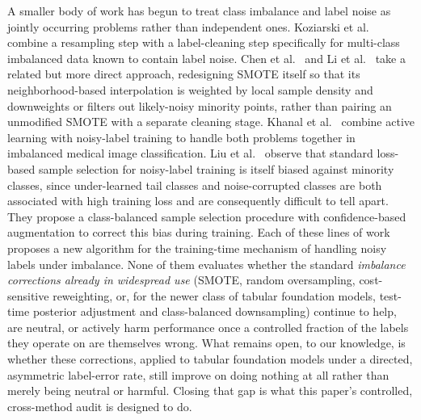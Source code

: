 A smaller body of work has begun to treat class imbalance and label noise as
jointly occurring problems rather than independent ones. Koziarski et
al.~\cite{koziarski2020ccr} combine a resampling step with a label-cleaning step
specifically for multi-class imbalanced data known to contain label noise.
Chen et al.~\cite{chen2021rsmote} and Li et al.~\cite{li2024wrnd} take a
related but more direct approach, redesigning SMOTE itself so that its
neighborhood-based interpolation is weighted by local sample density and
downweights or filters out likely-noisy minority points, rather than pairing
an unmodified SMOTE with a separate cleaning stage. Khanal et
al.~\cite{khanal2024activelabel} combine active learning with
noisy-label training to handle both problems together in imbalanced medical
image classification. Liu et al.~\cite{liu2024imbalancednoisy} observe that
standard loss-based sample selection for noisy-label training is itself biased
against minority classes, since under-learned tail classes and noise-corrupted
classes are both associated with high training loss and are consequently
difficult to tell apart. They propose a class-balanced sample selection
procedure with confidence-based augmentation to correct this bias during
training. Each of these lines of work proposes a new algorithm for the
training-time mechanism of handling noisy labels under imbalance. None of them
evaluates whether the standard \emph{imbalance corrections already in widespread use}
(SMOTE, random oversampling, cost-sensitive reweighting, or, for the newer
class of tabular foundation models, test-time posterior adjustment and
class-balanced downsampling) continue to help, are neutral, or actively harm
performance once a controlled fraction of the labels they operate on are
themselves wrong. What remains open, to our knowledge, is whether these
corrections, applied to tabular foundation models under a directed,
asymmetric label-error rate, still improve on doing nothing at all rather
than merely being neutral or harmful. Closing that gap is what this
paper's controlled, cross-method audit is designed to do.
